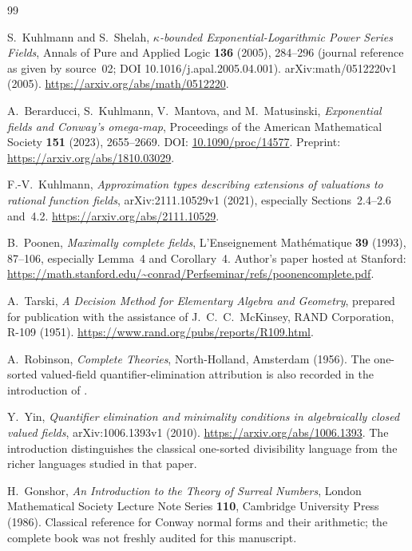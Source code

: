 \documentclass[11pt,letterpaper]{article}
\numberwithin{equation}{section}
\theoremstyle{definition}
\theoremstyle{remark}
\begin{document}
\begin{thebibliography}{99}

S.~Kuhlmann and S.~Shelah,
\emph{$\kappa$-bounded Exponential-Logarithmic Power Series Fields},
Annals of Pure and Applied Logic \textbf{136} (2005), 284--296
(journal reference as given by source~02; DOI 10.1016/j.apal.2005.04.001).
arXiv:math/0512220v1 (2005).
\url{https://arxiv.org/abs/math/0512220}.

A.~Berarducci, S.~Kuhlmann, V.~Mantova, and M.~Matusinski,
\emph{Exponential fields and Conway's omega-map},
Proceedings of the American Mathematical Society \textbf{151} (2023), 2655--2669.
DOI: \href{https://doi.org/10.1090/proc/14577}{10.1090/proc/14577}.
Preprint: \url{https://arxiv.org/abs/1810.03029}.

F.-V.~Kuhlmann,
\emph{Approximation types describing extensions of valuations to rational function fields},
arXiv:2111.10529v1 (2021), especially Sections~2.4--2.6 and~4.2.
\url{https://arxiv.org/abs/2111.10529}.

B.~Poonen,
\emph{Maximally complete fields},
L'Enseignement Math\'ematique \textbf{39} (1993), 87--106,
especially Lemma~4 and Corollary~4.
Author's paper hosted at Stanford:
\url{https://math.stanford.edu/~conrad/Perfseminar/refs/poonencomplete.pdf}.

A.~Tarski,
\emph{A Decision Method for Elementary Algebra and Geometry},
prepared for publication with the assistance of J.~C.~C.~McKinsey,
RAND Corporation, R-109 (1951).
\url{https://www.rand.org/pubs/reports/R109.html}.

A.~Robinson,
\emph{Complete Theories},
North-Holland, Amsterdam (1956).
The one-sorted valued-field quantifier-elimination attribution is also recorded in the introduction of \cite{Yin}.

Y.~Yin,
\emph{Quantifier elimination and minimality conditions in algebraically closed valued fields},
arXiv:1006.1393v1 (2010).
\url{https://arxiv.org/abs/1006.1393}.
The introduction distinguishes the classical one-sorted divisibility language from the richer languages studied in that paper.

H.~Gonshor,
\emph{An Introduction to the Theory of Surreal Numbers},
London Mathematical Society Lecture Note Series \textbf{110},
Cambridge University Press (1986).
Classical reference for Conway normal forms and their arithmetic; the complete book was not freshly audited for this manuscript.


\end{thebibliography}
\end{document}
